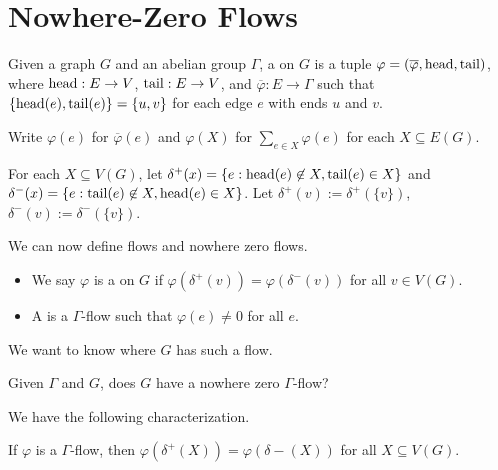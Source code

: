 \documentclass[main.tex]{subfiles}
\begin{document}
\section{Nowhere-Zero Flows} 
\begin{definition*}
  Given a graph $G$ and an abelian group $\Gamma$,
  a  on $G$ is a tuple
  $\varphi = (\overline{\varphi}, \operatorname{head}, \operatorname{tail})$,
  where $\operatorname{head}: E \to V$, $\operatorname{tail}: E \to V$,
  and $\overline{\varphi} : E \to \Gamma$ such that
  $\{\operatorname{head}(e), \operatorname{tail}(e) \} = \{u, v\}$ for each edge $e$ with
  ends $u$ and $v$.
\end{definition*}
Write $\varphi(e)$ for $\overline{\varphi}(e)$ and $\varphi(X)$ for
$\sum_{e \in X} \varphi(e)$ for each $X \subseteq E(G)$.
\begin{notation*}
For each $X \subseteq V(G)$, let $\delta^+(x) = \{e : \operatorname{head}(e) \not \in X, \operatorname{tail}(e) \in X\}$ and $\delta^-(x) = \{e : \operatorname{tail}(e) \not \in X, \operatorname{head}(e) \in X\}$. Let $\delta^+(v) := \delta^+(\{v\})$, $\delta^-(v) := \delta^-(\{v\})$. 
\end{notation*}
We can now define flows and nowhere zero flows.
\begin{definition*}
  \listhack
  \begin{itemize}
    \item We say $\varphi$ is a  on $G$ if
      $\varphi(\delta^+(v)) = \varphi(\delta^-(v))$ for all $v \in V(G)$.

    \item A  is a
      $\Gamma$-flow such that $\varphi(e)\neq 0$ for all $e$.
  \end{itemize}
\end{definition*}
We want to know where $G$ has such a flow.
\begin{question*}
  Given $\Gamma$ and $G$, does $G$ have a nowhere zero $\Gamma$-flow?
\end{question*}
We have the following characterization.
\begin{lemma}
  If $\varphi$ is a $\Gamma$-flow, then $\varphi(\delta^+(X)) = \varphi(\delta-(X))$
  for all $X\subseteq V(G)$.
\end{lemma}
\end{document}
